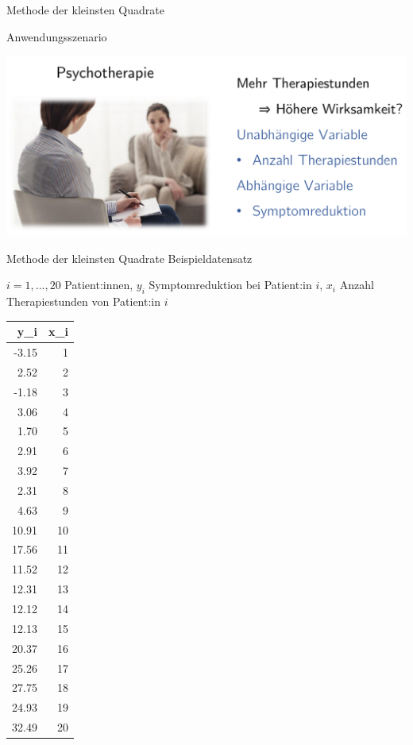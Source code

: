 \documentclass[
  8pt,
  ignorenonframetext,
]{beamer}
\begin{document}
\begin{frame}{Methode der kleinsten Quadrate}
\protect\hypertarget{methode-der-kleinsten-quadrate}{}
\large

Anwendungsszenario \vspace{2mm}

\begin{center}\includegraphics[width=0.8\linewidth]{1_Abbildungen/alm_1_beispielszenario} \end{center}
\end{frame}

\begin{frame}{Methode der kleinsten Quadrate}
\protect\hypertarget{methode-der-kleinsten-quadrate-1}{}
Beispieldatensatz

\center
\footnotesize

\(i = 1,...,20\) Patient:innen, \(y_i\) Symptomreduktion bei Patient:in
\(i\), \(x_i\) Anzahl Therapiestunden von Patient:in \(i\)


\begin{longtable}[]{@{}rr@{}}
\toprule
y\_i & x\_i \\
\midrule
\endhead
-3.15 & 1 \\
2.52 & 2 \\
-1.18 & 3 \\
3.06 & 4 \\
1.70 & 5 \\
2.91 & 6 \\
3.92 & 7 \\
2.31 & 8 \\
4.63 & 9 \\
10.91 & 10 \\
17.56 & 11 \\
11.52 & 12 \\
12.31 & 13 \\
12.12 & 14 \\
12.13 & 15 \\
20.37 & 16 \\
25.26 & 17 \\
27.75 & 18 \\
24.93 & 19 \\
32.49 & 20 \\
\bottomrule
\end{longtable}
\end{frame}
\end{document}
